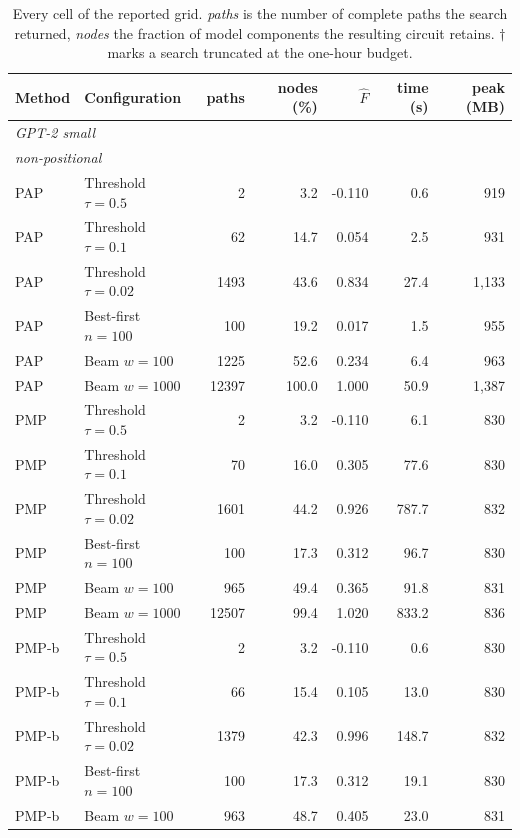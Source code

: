 \documentclass[11pt,a4paper]{article}
\begin{document}
\begin{table}[h]
\centering
\scriptsize
\caption{Every cell of the reported grid. \emph{paths} is the number of complete paths the
search returned, \emph{nodes} the fraction of model components the resulting circuit retains.
$\dagger$ marks a search truncated at the one-hour budget.}
\label{tab:full}
\begin{tabular}{llrrrrr}
\toprule
Method & Configuration & paths & nodes (\%) & $\widehat{F}$ & time (s) & peak (MB) \\
\midrule
\multicolumn{7}{l}{\itshape GPT-2 small} \\
\multicolumn{7}{l}{\quad\itshape non-positional} \\
\quad PAP & Threshold $\tau{=}0.5$ & 2 & 3.2 & -0.110 & 0.6 & 919 \\
\quad PAP & Threshold $\tau{=}0.1$ & 62 & 14.7 & 0.054 & 2.5 & 931 \\
\quad PAP & Threshold $\tau{=}0.02$ & 1493 & 43.6 & 0.834 & 27.4 & 1,133 \\
\quad PAP & Best-first $n{=}100$ & 100 & 19.2 & 0.017 & 1.5 & 955 \\
\quad PAP & Beam $w{=}100$ & 1225 & 52.6 & 0.234 & 6.4 & 963 \\
\quad PAP & Beam $w{=}1000$ & 12397 & 100.0 & 1.000 & 50.9 & 1,387 \\
\quad PMP & Threshold $\tau{=}0.5$ & 2 & 3.2 & -0.110 & 6.1 & 830 \\
\quad PMP & Threshold $\tau{=}0.1$ & 70 & 16.0 & 0.305 & 77.6 & 830 \\
\quad PMP & Threshold $\tau{=}0.02$ & 1601 & 44.2 & 0.926 & 787.7 & 832 \\
\quad PMP & Best-first $n{=}100$ & 100 & 17.3 & 0.312 & 96.7 & 830 \\
\quad PMP & Beam $w{=}100$ & 965 & 49.4 & 0.365 & 91.8 & 831 \\
\quad PMP & Beam $w{=}1000$ & 12507 & 99.4 & 1.020 & 833.2 & 836 \\
\quad PMP-b & Threshold $\tau{=}0.5$ & 2 & 3.2 & -0.110 & 0.6 & 830 \\
\quad PMP-b & Threshold $\tau{=}0.1$ & 66 & 15.4 & 0.105 & 13.0 & 830 \\
\quad PMP-b & Threshold $\tau{=}0.02$ & 1379 & 42.3 & 0.996 & 148.7 & 832 \\
\quad PMP-b & Best-first $n{=}100$ & 100 & 17.3 & 0.312 & 19.1 & 830 \\
\quad PMP-b & Beam $w{=}100$ & 963 & 48.7 & 0.405 & 23.0 & 831 \\

\end{tabular}
\end{table}
\end{document}

